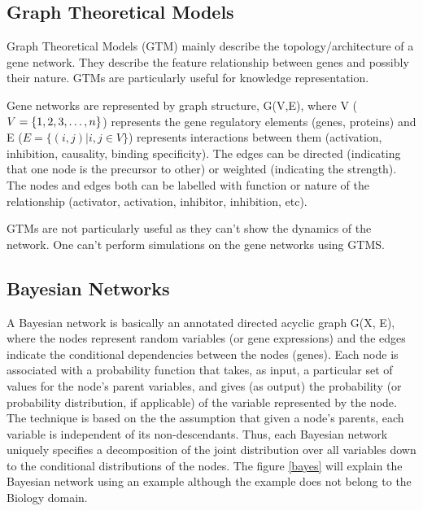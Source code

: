 \documentclass[oneside, a4paper, 11pt]{book}
\begin{document}
\subsection{Graph Theoretical Models}
Graph Theoretical Models (GTM) mainly describe the topology/architecture of a gene network. They describe the feature relationship between genes and possibly their nature. GTMs are particularly useful for knowledge representation. 

Gene networks are represented by graph structure, G(V,E), where V ($V = \{1, 2, 3, \ldots,\\ n\}$) represents the gene regulatory elements (genes, proteins) and E ($E = \{(i, j)|i,j \in V\}$) represents interactions between them (activation, inhibition, causality, binding specificity). The edges can be directed (indicating that one node is the precursor to other) or weighted (indicating the strength). The nodes and edges both can be labelled with function or nature of the relationship (activator, activation, inhibitor, inhibition, etc).

GTMs are not particularly useful as they can't show the dynamics of the network. One can't perform simulations on the gene networks using GTMS.

\subsection{Bayesian Networks}
A Bayesian network is basically an annotated directed acyclic graph G(X, E), where the nodes represent random variables (or gene expressions) and the edges indicate the conditional dependencies between the nodes (genes). Each node is associated with a probability function that takes, as input, a particular set of values for the node's parent variables, and gives (as output) the probability (or probability distribution, if applicable) of the variable represented by the node. The technique is based on the the assumption that given a node's parents, each variable is independent of its non-descendants. Thus, each Bayesian network uniquely specifies a decomposition of the joint distribution over all variables down to the conditional distributions of the nodes\cite{heckerman, zou}. The figure \ref{bayes} will explain the Bayesian network using an example although the example does not belong to the Biology domain.
\end{document}
